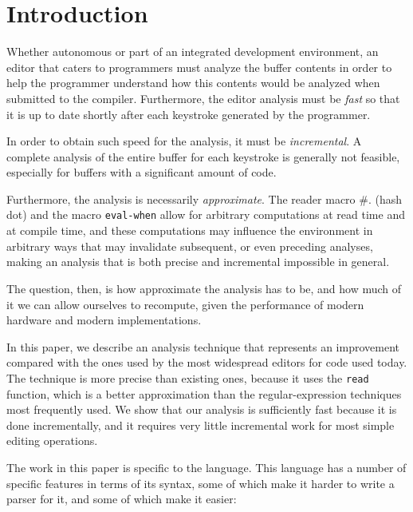 \section{Introduction}

Whether autonomous or part of an integrated development environment,
an editor that caters to \commonlisp{} programmers must analyze the
buffer contents in order to help the programmer understand how this
contents would be analyzed when submitted to the \commonlisp{}
compiler.  Furthermore, the editor analysis must be \emph{fast} so
that it is up to date shortly after each keystroke generated by the
programmer.

In order to obtain such speed for the analysis, it must be
\emph{incremental}.  A complete analysis of the entire buffer for each
keystroke is generally not feasible, especially for buffers with a
significant amount of code.

Furthermore, the analysis is necessarily \emph{approximate}.  The
reader macro \#. (hash dot) and the macro \texttt{eval-when} allow for
arbitrary computations at read time and at compile time, and these
computations may influence the environment in arbitrary ways that may
invalidate subsequent, or even preceding analyses, making an analysis
that is both precise and incremental impossible in general.

The question, then, is how approximate the analysis has to be, and how
much of it we can allow ourselves to recompute, given the performance
of modern hardware and modern \commonlisp{} implementations.

In this paper, we describe an analysis technique that represents an
improvement compared with the ones used by the most widespread editors
for \commonlisp{} code used today.  The technique is more precise than
existing ones, because it uses the \commonlisp{} \texttt{read}
function, which is a better approximation than the regular-expression
techniques most frequently used.  We show that our analysis is
sufficiently fast because it is done incrementally, and it requires
very little incremental work for most simple editing operations.

The work in this paper is specific to the \commonlisp{} language.
This language has a number of specific features in terms of its
syntax, some of which make it harder to write a parser for it, and
some of which make it easier:

